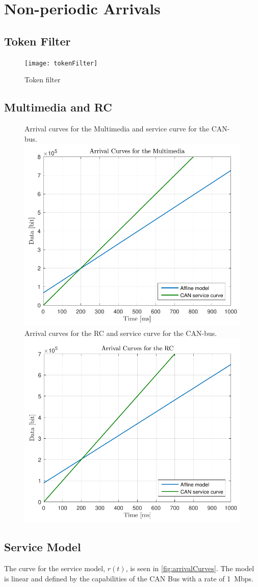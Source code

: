 \section{Non-periodic Arrivals}

\subsection{Token Filter}

\begin{figure}[H]
	\texttt{[image: tokenFilter]}
	\caption{Token filter}
	\label{fig:tokenFilter}
\end{figure}

\subsection{Multimedia and RC}
\begin{figure}[H]
	\captionbox
	{
		Arrival curves for the Multimedia and service curve for the CAN-bus.
		\label{fig:ArrivalCurvesMultimedia}
	}
	{
		\includegraphics[width=.46\textwidth]{figures/ArrivalCurvesMultimedia}
	}
	\hspace{5pt}
	\captionbox
	{
		Arrival curves for the RC and service curve for the CAN-bus.
		\label{fig:ArrivalCurvesRC}
	}
	{
		\includegraphics[width=.46\textwidth]{figures/ArrivalCurvesRC}
	}
\end{figure}

\subsection{Service Model}
The curve for the service model, $r(t)$, is seen in \autoref{fig:arrivalCurves}. The model is linear and defined by the capabilities of the CAN Bus with a rate of \SI{1}{Mbps}.
